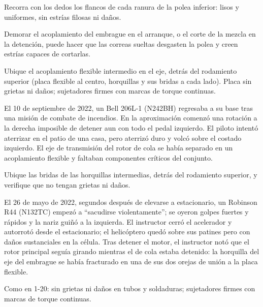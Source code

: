 Recorra con los dedos los flancos de cada ranura de la polea inferior: lisos y uniformes, sin estrías filosas ni daños.

\begin{nota}
Demorar el acoplamiento del embrague en el arranque, o el corte de la mezcla en la detención, puede hacer que las correas sueltas desgasten la polea y creen estrías capaces de cortarlas.
\end{nota}

Ubique el acoplamiento flexible intermedio en el eje, detrás del rodamiento superior (placa flexible al centro, horquillas y sus bridas a cada lado). Placa sin grietas ni daños; sujetadores firmes con marcas de torque continuas.

\begin{caso}
El 10 de septiembre de 2022, un Bell 206L-1 (N242BH) regresaba a su base tras una misión de combate de incendios. En la aproximación comenzó una rotación a la derecha imposible de detener aun con todo el pedal izquierdo. El piloto intentó aterrizar en el patio de una casa, pero aterrizó duro y volcó sobre el costado izquierdo. El eje de transmisión del rotor de cola se había separado en un acoplamiento flexible y faltaban componentes críticos del conjunto.
\end{caso}

Ubique las bridas de las horquillas intermedias, detrás del rodamiento superior, y verifique que no tengan grietas ni daños.

\begin{caso}
El 26 de mayo de 2022, segundos después de elevarse a estacionario, un Robinson R44 (N132TC) empezó a ``sacudirse violentamente''; se oyeron golpes fuertes y rápidos y la nariz guiñó a la izquierda. El instructor cerró el acelerador y autorrotó desde el estacionario; el helicóptero quedó sobre sus patines pero con daños sustanciales en la célula. Tras detener el motor, el instructor notó que el rotor principal seguía girando mientras el de cola estaba detenido: la horquilla del eje del embrague se había fracturado en una de sus dos orejas de unión a la placa flexible.
\end{caso}

Como en 1-20: sin grietas ni daños en tubos y soldaduras; sujetadores firmes con marcas de torque continuas.

